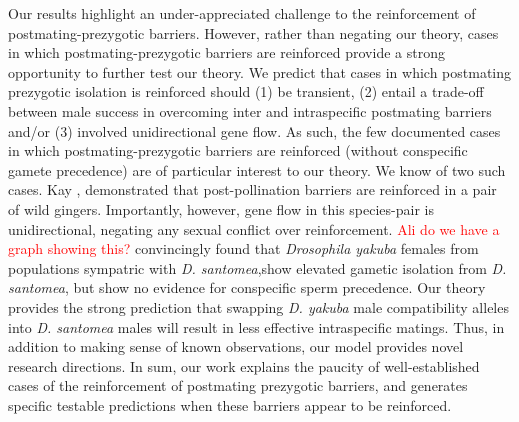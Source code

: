 \documentclass[11pt]{article}
\begin{document}
Our results highlight an under-appreciated challenge to the reinforcement of postmating-prezygotic barriers. 
However, rather than negating our theory, cases in which  postmating-prezygotic barriers are reinforced provide a strong opportunity to further test our theory.  
We predict that cases in which postmating prezygotic isolation is reinforced should (1) be transient, (2)  entail a trade-off between male success in overcoming  inter and intraspecific postmating barriers and/or (3) involved unidirectional gene flow. 
As such, the few documented cases in which postmating-prezygotic barriers are reinforced (without conspecific gamete precedence) are of particular interest to our theory.   
We know of two such cases. 
Kay \citep{kay2008, yost2009}, demonstrated that post-pollination barriers are reinforced in a pair of wild gingers. 
Importantly, however, gene flow in this species-pair is unidirectional, negating any sexual conflict over reinforcement. \textcolor{red}{Ali do we have a graph showing this?} %
\citet{matute2010} convincingly found that \textit{Drosophila yakuba} females from populations sympatric with \textit{D. santomea},show elevated gametic isolation from \textit{D. santomea}, but show no evidence for conspecific sperm precedence. 
Our theory provides the strong prediction that swapping \textit{D. yakuba} male compatibility alleles into  \textit{D. santomea} males will result in less effective intraspecific matings. %
Thus, in addition to making sense of known observations, our model provides novel research directions.  
In sum, our work explains the paucity of well-established cases of the reinforcement of postmating prezygotic barriers, and generates specific testable predictions when these barriers appear to be reinforced. 
\end{document}
